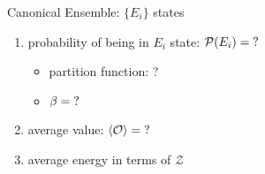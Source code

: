 

\vspace*{\fill}
\centering

Canonical Ensemble: $\{ E_{i} \}$ states

\begin{enumerate}
    \item probability of being in $E_{i}$ state: $\mathcal{P}(E_{i}) = {\rm ?}$
    \begin{itemize}
    \item partition function: ?
    \item $\beta = {\rm ?}$
    \end{itemize}
\item average value: $\langle \mathcal{O} \rangle = {\rm ?}$
\item average energy in terms of $\mathcal{Z}$
\end{enumerate}

\centering
\vspace*{\fill}

